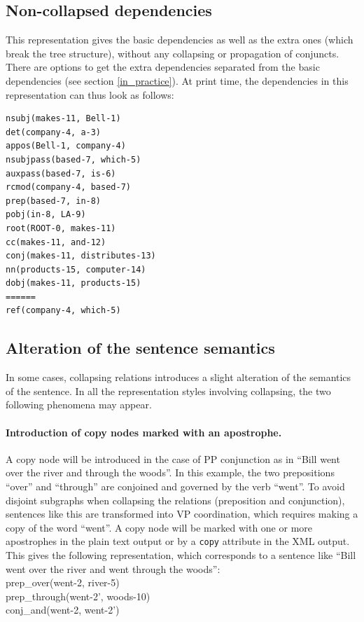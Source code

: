 \documentclass[11pt,letterpaper]{article}
\begin{document}
\subsection{Non-collapsed dependencies}\label{non-collapsed}
This representation gives the basic dependencies as well as the extra ones (which break the tree structure), without any collapsing or propagation of conjuncts. There are options to get the extra dependencies separated from the basic dependencies (see section \ref{in_practice}). At print time, the dependencies in this representation can thus look as follows:
\begin{verbatim}
nsubj(makes-11, Bell-1)
det(company-4, a-3)
appos(Bell-1, company-4)
nsubjpass(based-7, which-5)
auxpass(based-7, is-6)
rcmod(company-4, based-7)
prep(based-7, in-8)
pobj(in-8, LA-9)
root(ROOT-0, makes-11)
cc(makes-11, and-12)
conj(makes-11, distributes-13)
nn(products-15, computer-14)
dobj(makes-11, products-15)
======
ref(company-4, which-5)
\end{verbatim}


\subsection{Alteration of the sentence semantics}\label{alteration}
In some cases, collapsing relations introduces a slight alteration of the semantics of the sentence. In all the representation styles involving collapsing, the two following phenomena may appear.

\paragraph{Introduction of copy nodes marked with an apostrophe.}
A copy node will be introduced in the case of PP conjunction as in ``Bill went over the river and through the woods''. In this example, the two prepositions ``over'' and ``through'' are conjoined and governed by the verb ``went''. To avoid disjoint subgraphs when collapsing the relations (preposition and conjunction), sentences like this are transformed into VP coordination, which requires making a copy of the word ``went''. A copy node will be marked with one or more apostrophes in the plain text output or by a \texttt{copy} attribute in the XML output. This gives the following representation, which corresponds to a sentence like ``Bill went over the river and went through the woods'':\\
\indent prep\_over(went-2, river-5)\\
\indent prep\_through(went-2’, woods-10)\\
\indent conj\_and(went-2, went-2’)
\end{document}
